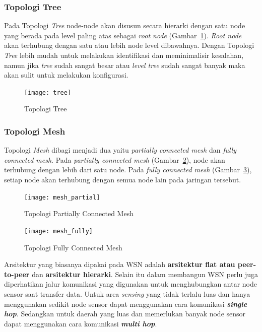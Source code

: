\subsubsection{Topologi Tree}
Pada Topologi \textit{Tree} node-node akan disusun secara hierarki dengan satu node yang berada pada level paling atas sebagai \textit{root node} (Gambar~\ref{fig:tree}). \textit{Root node} akan terhubung dengan satu atau lebih node level dibawahnya. Dengan Topologi \textit{Tree} lebih mudah untuk melakukan identifikasi dan meminimalisir kesalahan, namun jika \textit{tree} sudah sangat besar atau \textit{level tree} sudah sangat banyak maka akan sulit untuk melakukan konfigurasi.
\begin{figure} [H]
	\centering  
	\texttt{[image: tree]}  
	\caption[Topologi Tree]{Topologi Tree} 
	\label{fig:tree} 
\end{figure} 

\subsubsection{Topologi Mesh}
Topologi \textit{Mesh} dibagi menjadi dua yaitu \textit{partially connected mesh} dan \textit{fully connected mesh}. Pada \textit{partially connected mesh} (Gambar~\ref{fig:mesh_partial}), node akan terhubung dengan lebih dari satu node. Pada \textit{fully connected mesh} (Gambar~\ref{fig:mesh_fully}), setiap node akan terhubung dengan semua node lain pada jaringan tersebut.
\begin{figure} [H]
	\centering  
	\texttt{[image: mesh\_partial]}  
	\caption[Topologi Partially Connected Mesh]{Topologi Partially Connected Mesh} 
	\label{fig:mesh_partial} 
\end{figure} 
\begin{figure} [H]
	\centering  
	\texttt{[image: mesh\_fully]}  
	\caption[Topologi Fully Connected Mesh]{Topologi Fully Connected Mesh} 
	\label{fig:mesh_fully} 
\end{figure} 

Arsitektur yang biasanya dipakai pada WSN adalah \textbf{arsitektur flat atau peer-to-peer} dan \textbf{arsitektur hierarki}. Selain itu dalam membangun WSN perlu juga diperhatikan jalur komunikasi yang digunakan untuk menghubungkan antar node sensor saat transfer data. Untuk area \textit{sensing} yang tidak terlalu luas dan hanya menggunakan sedikit node sensor dapat menggunakan cara komunikasi \textbf{\textit{single hop}}. Sedangkan untuk daerah yang luas dan memerlukan banyak node sensor dapat menggunakan cara komunikasi \textbf{\textit{multi hop}}. 


